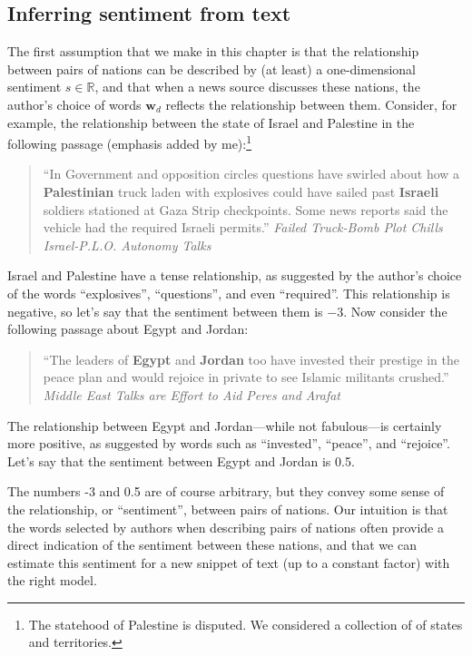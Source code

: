 \subsection{Inferring sentiment from text}
\label{sec:text_regression}
The first assumption that we make in this chapter is that the
relationship between pairs of nations can be described by (at least) a
one-dimensional sentiment $s \in \mathbb{R}$, and that when a news
source discusses these nations, the author's choice of words $\bm w_d$
reflects the relationship between them.  Consider, for example, the
relationship between the state of Israel and Palestine in the
following passage (emphasis added by me):\footnote{The statehood of
  Palestine is disputed.  We considered a collection of of states and
  territories.}
\begin{quote} ``In Government and opposition circles
  questions have swirled about how a \textbf{Palestinian} truck laden with
  explosives could have sailed past \textbf{Israeli} soldiers stationed at
  Gaza Strip checkpoints.  Some news reports said the vehicle had
  the required Israeli permits.'' \emph{Failed Truck-Bomb Plot Chills
    Israel-P.L.O. Autonomy Talks} \citep{nyt_haberman:1995}
\end{quote}
Israel and Palestine have a tense relationship, as suggested by the
author's choice of the words ``explosives'', ``questions'', and even
``required''.  This relationship is negative, so let's say that the
sentiment between them is $-3$. Now consider the
following passage about Egypt and Jordan:
\begin{quote} ``The leaders of \textbf{Egypt} and
  \textbf{Jordan} too have invested their prestige in the peace plan
  and would rejoice in private to see Islamic militants crushed.''
  \emph{Middle East Talks are Effort to Aid Peres and Arafat}
  \citep{nyt_jehl:1996}
\end{quote}
The relationship between Egypt and Jordan---while not fabulous---is
certainly more positive, as suggested by words such as ``invested'',
``peace'', and ``rejoice''.  Let's say that the sentiment between
Egypt and Jordan is 0.5.

The numbers -3 and 0.5 are of course arbitrary, but they convey some
sense of the relationship, or ``sentiment'', between pairs of nations.
Our intuition is that the words selected by authors when describing
pairs of nations often provide a direct indication of the sentiment
between these nations, and that we can estimate this sentiment for a
new snippet of text (up to a constant factor) with the right model.

